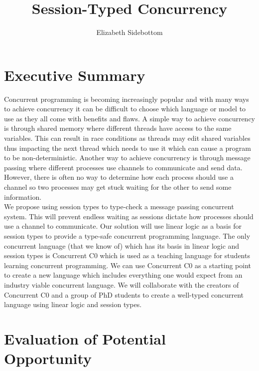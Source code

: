 \documentclass[11pt]{article}
\title{\vspace{-2cm} Session-Typed Concurrency}
\date{}
\author{Elizabeth Sidebottom}
\begin{document}
    \maketitle

    \section*{Executive Summary}
    Concurrent programming is becoming increasingly popular and with many ways to achieve concurrency 
    it can be difficult to choose which language or model to use as they all come with benefits and flaws.
    A simple way to achieve concurrency is through shared memory where different threads have access to 
    the same variables. This can result in race conditions as threads may edit shared variables thus
    impacting the next thread which needs to use it which can cause a program to be non-deterministic. 
    Another way to achieve concurrency is through message passing where different processes use channels 
    to communicate and send data. However, there is often no way to determine how each process should use 
    a channel so two processes may get stuck waiting for the other to send some information. \\

    \noindent
    We propose using session types to type-check a message passing concurrent system. This will prevent 
    endless waiting as sessions dictate how processes should use a channel to communicate. Our solution 
    will use linear logic as a basis for session types to provide a type-safe concurrent programming language.
    The only concurrent language (that we know of) which has its basis in linear logic and session types 
    is Concurrent C0 \supercite{C0Full} which is used as a teaching language for students learning concurrent 
    programming. We can use Concurrent C0 as a starting point to create a new language which includes everything 
    one would expect from an industry viable concurrent language. We will collaborate with the creators of 
    Concurrent C0 and a group of PhD students to create a well-typed concurrent language using linear logic 
    and session types. \\
   
    \section*{Evaluation of Potential Opportunity}

\end{document}
